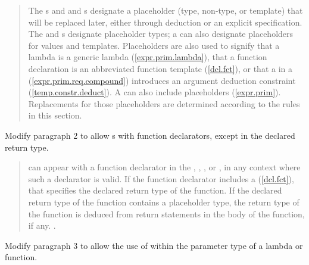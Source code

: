 \begin{quote}
\pnum
The s  and 
and s designate a placeholder
(type, non-type, or template) that will be replaced later, either through 
deduction or an explicit specification.
%
The  and  s 
designate placeholder types; a  can 
also designate placeholders for values and templates. 
%
Placeholders are also used to signify that a lambda is a generic lambda 
(\ref{expr.prim.lambda}), that a function declaration is an
abbreviated function template (\ref{dcl.fct}), or that a 
 in a 
(\ref{expr.prim.req.compound}) introduces an argument deduction constraint 
(\ref{temp.constr.deduct}).
%
\enternote
A  can also include placeholders (\ref{expr.prim}).
Replacements for those placeholders are determined according to the rules
in this section.
\exitnote
% 
\end{quote}

Modify paragraph 2 to allow s
with function declarators, except in the declared return type.

\begin{quote}
\pnum
{} can appear with a function 
declarator in the , ,
, or , 
in any context where such a declarator is valid. 
% 
If the function declarator includes a  
(\ref{dcl.fct}), that specifies the declared return type of the function.
% 
If the declared return type of the function contains a placeholder type, the 
return type of the function is deduced from return statements in the body of 
the function, if any.
%
.
%
\end{quote}

Modify paragraph 3 to allow the use of  within the 
parameter type of a lambda or function.

